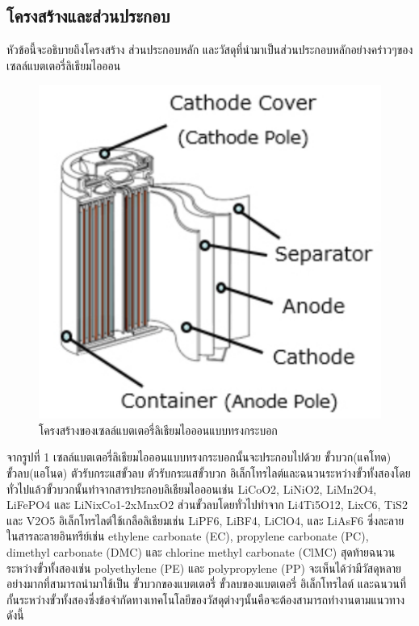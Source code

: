 \subsection{โครงสร้างและส่วนประกอบ}
หัวข้อนี้จะอธิบายถึงโครงสร้าง ส่วนประกอบหลัก และวัสดุที่นำมาเป็นส่วนประกอบหลักอย่างคร่าวๆของเซลล์แบตเตอรี่ลิเธียมไอออน
\begin{center}
	\begin{figure}
		\includegraphics[width=0.4\linewidth]{Chapters/img/Cyrinder_battery.pdf}
		\centering
		\captionsetup{justification=centering,margin=2cm}
		\caption{โครงสร้างของเซลล์แบตเตอรี่ลิเธียมไอออนแบบทรงกระบอก}
	\end{figure}
\end{center}
จากรูปที่ 1 เซลล์แบตเตอรี่ลิเธียมไอออนแบบทรงกระบอกนั้นจะประกอบไปด้วย ขั้วบวก(แคโทด) ขั้วลบ(แอโนด) ตัวรับกระแสขั้วลบ  ตัวรับกระแสขั้วบวก อิเล็กโทรไลต์และฉนวนระหว่างขั้วทั้งสองโดยทั่วไปแล้วขั้วบวกนั้นทำจากสารประกอบลิเธียมไอออนเช่น LiCoO2, LiNiO2, LiMn2O4, LiFePO4 และ LiNixCo1-2xMnxO2 ส่วนขั้วลบโดยทั่วไปทำจาก Li4Ti5O12, LixC6, TiS2 และ V2O5 อิเล็กโทรไลต์ใช้เกลือลิเธียมเช่น LiPF6, LiBF4, LiClO4, และ LiAsF6 ซึ่งละลายในสารละลายอินทรีย์เช่น ethylene carbonate (EC), propylene carbonate (PC), dimethyl carbonate (DMC) และ chlorine methyl carbonate (ClMC) สุดท้ายฉนวนระหว่างขั้วทั้งสองเช่น polyethylene (PE) และ polypropylene (PP) จะเห็นได้ว่ามีวัสดุหลายอย่างมากที่สามารถนำมาใช้เป็น ขั้วบวกของแบตเตอรี่ ขั้วลบของแบตเตอรี่ อิเล็กโทรไลต์ และฉนวนที่กั้นระหว่างขั้วทั้งสองซึ่งข้อจำกัดทางเทคโนโลยีของวัสดุต่างๆนั้นคือจะต้องสามารถทำงานตามแนวทางดังนี้
